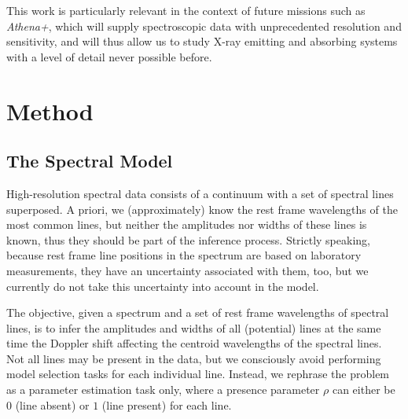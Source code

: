 \documentclass[12pt]{emulateapj}
\newcommand{\project}[1]{\textsl{#1}}
\newcommand{\athena}{\project{Athena+}}
\begin{document}
This work is particularly relevant in the context of future missions such as \athena, which will supply spectroscopic data with unprecedented resolution and sensitivity, and will thus allow us to study X-ray emitting and absorbing systems with a level of detail never possible before.

\section{Method}
\label{sec:method}

\subsection{The Spectral Model}
\label{sec:spectralmodel}

High-resolution spectral data consists of a continuum with a set of spectral lines superposed. A priori, we (approximately) know the rest frame wavelengths of the most common lines, but neither the amplitudes nor widths of these lines is known, thus they should be part of the inference process. Strictly speaking, because rest frame line positions in the spectrum are based on laboratory measurements, they have an uncertainty associated with them, too, but we currently do not take this uncertainty into account in the model.

The objective, given a spectrum and a set of rest frame wavelengths of spectral lines, is to infer the amplitudes and widths of all (potential) lines at the same time the Doppler shift affecting the centroid wavelengths of the spectral lines. Not all lines may be present in the data, but we consciously avoid performing model selection tasks for each individual line. Instead, we rephrase the problem as a parameter estimation task only, where a presence parameter $\rho$ can either be $0$ (line absent) or $1$ (line present) for each line.%
\end{document}
